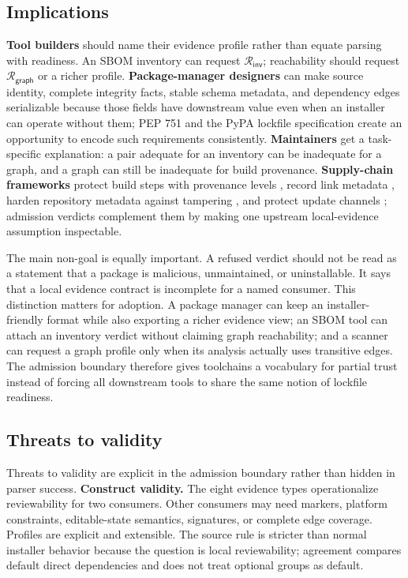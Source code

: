 \documentclass[10pt,conference]{IEEEtran}
\newcommand{\Req}{\mathcal{R}}
\newcommand{\inv}{\mathsf{inv}}
\newcommand{\graph}{\mathsf{graph}}
\begin{document}
\subsection{Implications}
\textbf{Tool builders} should name their evidence profile rather than equate parsing with readiness. An SBOM inventory can request $\Req_{\inv}$; reachability should request $\Req_{\graph}$ or a richer profile. \textbf{Package-manager designers} can make source identity, complete integrity facts, stable schema metadata, and dependency edges serializable because those fields have downstream value even when an installer can operate without them; PEP 751 \cite{pep751} and the PyPA lockfile specification \cite{pypaPylock} create an opportunity to encode such requirements consistently. \textbf{Maintainers} get a task-specific explanation: a pair adequate for an inventory can be inadequate for a graph, and a graph can still be inadequate for build provenance. \textbf{Supply-chain frameworks} protect build steps with provenance levels \cite{slsaSpec}, record link metadata \cite{torresarias2019intoto}, harden repository metadata against tampering \cite{torresarias2016omitting}, and protect update channels \cite{samuel2010tuf}; admission verdicts complement them by making one upstream local-evidence assumption inspectable.

The main non-goal is equally important. A refused verdict should not be read as a statement that a package is malicious, unmaintained, or uninstallable. It says that a local evidence contract is incomplete for a named consumer. This distinction matters for adoption. A package manager can keep an installer-friendly format while also exporting a richer evidence view; an SBOM tool can attach an inventory verdict without claiming graph reachability; and a scanner can request a graph profile only when its analysis actually uses transitive edges. The admission boundary therefore gives toolchains a vocabulary for partial trust instead of forcing all downstream tools to share the same notion of lockfile readiness.


\subsection{Threats to validity}
Threats to validity are explicit in the admission boundary rather than hidden in parser success. \textbf{Construct validity.} The eight evidence types operationalize reviewability for two consumers. Other consumers may need markers, platform constraints, editable-state semantics, signatures, or complete edge coverage. Profiles are explicit and extensible. The source rule is stricter than normal installer behavior because the question is local reviewability; agreement compares default direct dependencies and does not treat optional groups as default.
\end{document}
